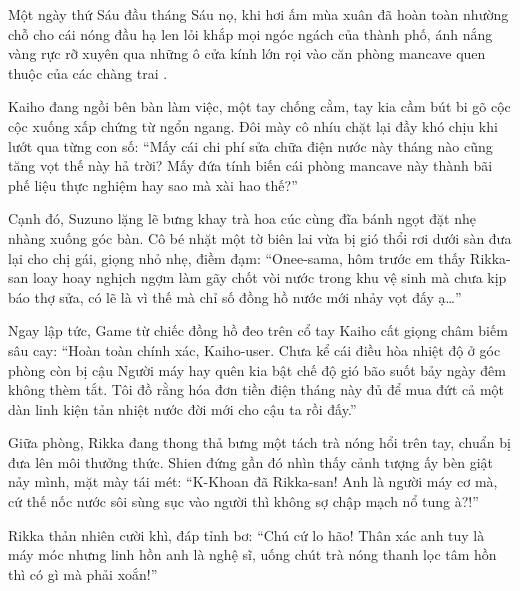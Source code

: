 \documentclass[../main.tex]{subfiles}
\begin{document}

Một ngày thứ Sáu đầu tháng Sáu nọ, khi hơi ấm mùa xuân đã hoàn toàn nhường chỗ cho cái nóng đầu hạ len lỏi khắp mọi ngóc ngách của thành phố, ánh nắng vàng rực rỡ xuyên qua những ô cửa kính lớn rọi vào căn phòng mancave quen thuộc của các chàng trai \hls.

Kaiho đang ngồi bên bàn làm việc, một tay chống cằm, tay kia cầm bút bi gõ cộc cộc xuống xấp chứng từ ngổn ngang. Đôi mày cô nhíu chặt lại đầy khó chịu khi lướt qua từng con số: ``Mấy cái chi phí sửa chữa điện nước này tháng nào cũng tăng vọt thế này hả trời? Mấy đứa tính biến cái phòng mancave này thành bãi phế liệu thực nghiệm hay sao mà xài hao thế?''

Cạnh đó, Suzuno lặng lẽ bưng khay trà hoa cúc cùng đĩa bánh ngọt đặt nhẹ nhàng xuống góc bàn. Cô bé nhặt một tờ biên lai vừa bị gió thổi rơi dưới sàn đưa lại cho chị gái, giọng nhỏ nhẹ, điềm đạm: ``Onee-sama, hôm trước em thấy Rikka-san loay hoay nghịch ngợm làm gãy chốt vòi nước trong khu vệ sinh mà chưa kịp báo thợ sửa, có lẽ là vì thế mà chỉ số đồng hồ nước mới nhảy vọt đấy ạ\dots''

Ngay lập tức, Game từ chiếc đồng hồ đeo trên cổ tay Kaiho cất giọng châm biếm sâu cay: ``Hoàn toàn chính xác, Kaiho-user. Chưa kể cái điều hòa nhiệt độ ở góc phòng còn bị cậu Người máy hay quên kia bật chế độ gió bão suốt bảy ngày đêm không thèm tắt. Tôi đồ rằng hóa đơn tiền điện tháng này đủ để mua đứt cả một dàn linh kiện tản nhiệt nước đời mới cho cậu ta rồi đấy.''

Giữa phòng, Rikka đang thong thả bưng một tách trà nóng hổi trên tay, chuẩn bị đưa lên môi thưởng thức. Shien đứng gần đó nhìn thấy cảnh tượng ấy bèn giật nảy mình, mặt mày tái mét: ``K-Khoan đã Rikka-san! Anh là người máy cơ mà, cứ thế nốc nước sôi sùng sục vào người thì không sợ chập mạch nổ tung à?!''


Rikka thản nhiên cười khì, đáp tỉnh bơ: ``Chú cứ lo hão! Thân xác anh tuy là máy móc nhưng linh hồn anh là nghệ sĩ, uống chút trà nóng thanh lọc tâm hồn thì có gì mà phải xoắn!''
\end{document}
